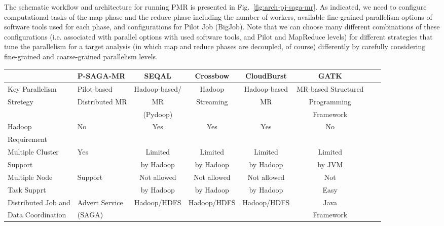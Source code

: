 \documentclass{sig-alternate}
\begin{document}
The schematic workflow and architecture for running PMR is presented in Fig.~\ref{fig:arch-pj-saga-mr}.  As indicated, we need to configure computational tasks of the map phase and the reduce phase including the number of workers, available fine-grained parallelism options of software tools used for each phase, and configurations for Pilot Job (BigJob).  Note that we can choose many different combinations of these configurations (i.e. associated with parallel options with used software tools, and Pilot and MapReduce levels) for different strategies that tune the parallelism for a target analysis (in which map and reduce phases are decoupled, of course) differently by carefully considering fine-grained and coarse-grained parallelism levels.    

\begin{center}
\begin{table}[ht]
{\small
\hfill{}
\begin{tabular}{|l|l|c|c|c|c|c|c|}
\hline
  & \textbf{P-SAGA-MR}\cite{pmr2012} & \textbf{SEQAL}\cite{seal2011} & \textbf{Crossbow}\cite{langmead2009} & \textbf{CloudBurst}\cite{cloudburst} & \textbf{GATK}\cite{gatk} \\ \hline
 \hline 
Key Parallelism   & Pilot-based   &  Hadoop-based/  &  Hadoop   & Hadoop-based & MR-based Structured \\ 
Stretegy  & Distributed MR & MR  & Streaming  & MR & Programming  \\
& & (Pydoop) &  & & Framework  \\ \hline
  
Hadoop & No & Yes & Yes\footnote[1] & Yes & No \\ 
Requirement  & & & &  &\\ \hline  
    
Multiple  Cluster & Yes  & Limited   & Limited  & Limited  & Limited \\
Support &  & by Hadoop &  by Hadoop & by Hadoop  & by JVM   \\ \hline

Multiple Node & Support & Not allowed  & Not allowed  & Not allowed & Not  \\
Task Supprt &  & by Hadoop & by Hadoop & by Hadoop & Easy  \\ \hline
Distributed Job and  & Advert Service  & Hadoop/HDFS & Hadoop/HDFS & Hadoop/HDFS & Java \\ 
Data Coordination &(SAGA) &  & & & Framework\\ \hline



\end{tabular}}
\end{table}
\end{center}
\end{document}

